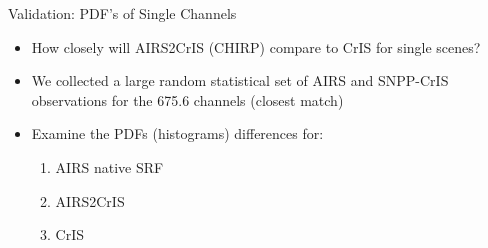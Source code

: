 \documentclass[10pt,t]{beamer}
\begin{document}
\begin{frame}[label={sec:orge4afeb9}]{Validation: PDF's of Single Channels}
\begin{itemize}
\item How closely will AIRS2CrIS (CHIRP) compare to CrIS for single scenes?
\item We collected a large random statistical set of AIRS and SNPP-CrIS observations for the 675.6 \wn channels (closest match)
\item Examine the PDFs (histograms) differences for:
\begin{enumerate}
\item AIRS native SRF
\item AIRS2CrIS
\item CrIS
\end{enumerate}
\end{itemize}
\end{frame}
\end{document}
